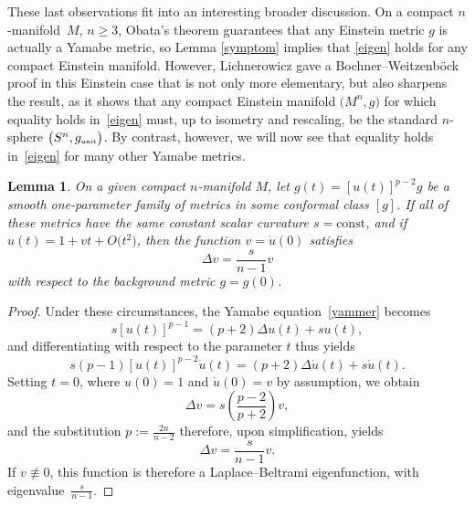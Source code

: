\documentclass[pdftex]{sigma}
\numberwithin{equation}{section}
\newtheorem{Lemma}[Theorem]{Lemma}
\begin{document}
These last observations fit into an interesting broader discussion. On a compact $n$-mani\-fold~$M$, $n \geq 3$,
Obata's theorem guarantees that any {Einstein} metric $g$
is actually a Yamabe metric, so Lemma \ref{symptom} implies that \eqref{eigen} holds for any compact Einstein manifold. However,
 Lichnerowicz gave a Bochner--Weitzenb\"ock proof \cite{lichnebook} in this Einstein case that is not only more elementary, but also sharpens the result, as it shows that
 any compact Einstein manifold $\big(M^n,g\big)$ for which equality holds
 in~\eqref{eigen} must, up to isometry and rescaling, be the standard $n$-sphere $\big(S^n, g_{\text{\tiny unit}}\big)$.
 By contrast, however,
we will now see that equality holds in~\eqref{eigen} for many other Yamabe metrics.

\begin{Lemma} \label{plain}
On a given compact $n$-manifold $M$, let
 $g(t)= [u(t)]^{p-2}g$ be a smooth one-parameter family of metrics in some conformal class $[g]$. If all of these metrics have the same
constant scalar curvature $s= \text{const}$, and if $u(t) = 1 + vt + O\big(t^2\big)$, then the function $v= \dot{u}(0)$ satisfies
\begin{equation*}
\Delta v = \frac{s}{n-1} v
\end{equation*}
with respect to the background metric $g=g(0)$.
\end{Lemma}
\begin{proof} Under these circumstances, the
 Yamabe equation~\eqref{yammer} becomes
\begin{equation*}
s [u(t)]^{p-1} = (p+2) \Delta u(t) + su(t),
\end{equation*}
and differentiating with respect to the parameter $t$ thus yields
\begin{equation*}
s(p-1) [u(t)]^{p-2} \dot{u}(t) = (p+2)\Delta \dot{u}(t)+ s\dot{u}(t).
\end{equation*}
Setting $t=0$, where $u(0)=1$ and $\dot{u}(0)=v$ by assumption, we obtain
\begin{equation*}
\Delta v = s \left(\frac{p-2}{p+2}\right) v,
\end{equation*}
and the substitution $p :=\frac{2n}{n-2}$ therefore, upon simplification, yields
\begin{equation*}
 \Delta v = \frac{s}{n-1} v.
\end{equation*}
 If $v\not\equiv 0$, this function is therefore a Laplace--Beltrami
 eigenfunction, with eigenvalue~$\frac{s}{n-1}$.
\end{proof}
\end{document}
